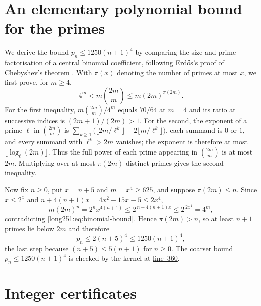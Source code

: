 \documentclass[11pt]{article}
\begin{document}
\appendix
\section{An elementary polynomial bound for the primes}\label{long251:app:prime-bound}

We derive the bound $p_n\le1250(n+1)^4$ by comparing the size and prime
factorisation of a central binomial coefficient, following
Erd\H{o}s's proof of Chebyshev's theorem
\cite[\S1, pp.~194--196]{erdos1932}.  With $\pi(x)$ denoting the number
of primes at most $x$, we first prove, for $m\ge4$,
\begin{equation}\label{long251:eq:binomial-bound}
 4^m<m\binom{2m}{m}\le m(2m)^{\pi(2m)} .
\end{equation}
For the first inequality, $m\binom{2m}{m}/4^{m}$ equals $70/64$ at $m=4$ and
its ratio at successive indices is $(2m+1)/(2m)>1$.  For the second, the
exponent of a prime $\ell$ in $\binom{2m}{m}$ is
$\sum_{k\ge1}\bigl(\lfloor2m/\ell^{k}\rfloor-2\lfloor m/\ell^{k}\rfloor\bigr)$,
each summand is $0$ or $1$, and every summand with $\ell^{k}>2m$ vanishes;
the exponent is therefore at most $\lfloor\log_\ell(2m)\rfloor$.
Thus the full power of each prime appearing in $\binom{2m}{m}$ is at most
$2m$.  Multiplying over at most $\pi(2m)$ distinct primes gives the second
inequality.

Now fix $n\ge0$, put $x=n+5$ and $m=x^4\ge625$, and suppose $\pi(2m)\le n$.
Since $x\le2^{x}$ and $n+4(n+1)x=4x^2-15x-5\le2x^4$,
\[
 m(2m)^{n}=2^{n}x^{4(n+1)}
 \le2^{\,n+4(n+1)x}\le2^{\,2x^4}=4^{m},
\]
contradicting \eqref{long251:eq:binomial-bound}.  Hence $\pi(2m)>n$, so at least $n+1$
primes lie below $2m$ and therefore
\[
 p_n\le2(n+5)^4\le1250(n+1)^4 ,
\]
the last step because $(n+5)\le5(n+1)$ for $n\ge0$.  The coarser bound
$p_n\le1250(n+1)^4$ is checked by the kernel at
\href{https://github.com/wcook04/plectis-erdos/blob/3d6d938d696fed0fb71dd55115a18a73738ff223/lean/ErdosProblems/Erdos251/PrimeGapDyadicTail.lean\#L360}{line~360}.

\section{Integer certificates}\label{long251:app:certificates}
\end{document}

